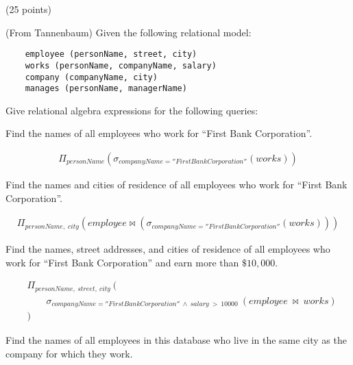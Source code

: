 \begin{problem} (25 points)

  \noindent
  (From Tannenbaum) Given the following relational model:

  \centering
  \begin{Verbatim}
    employee (personName, street, city)
    works (personName, companyName, salary)
    company (companyName, city)
    manages (personName, managerName)
  \end{Verbatim}

  \flushleft
  \noindent
  Give relational algebra expressions for the following queries:

  \begin{enumalph}
    \item Find the names of all employees who work for ``First Bank Corporation''.
    \begin{Answer}
      \begin{align*}
        \Pi_{personName}(\sigma_{companyName=''First Bank Corporation''}(works))
      \end{align*}
    \end{Answer}
    
    \item Find the names and cities of residence of all employees
    who work for ``First Bank Corporation''.
    \begin{Answer}
      \begin{align*}
        \Pi_{personName,\;city}(employee \Join (\sigma_{companyName = ''First Bank Corporation''}(works)))
      \end{align*}
    \end{Answer}
    \item Find the names, street addresses, and cities of residence
    of all employees who work for ``First Bank Corporation''
    and earn more than $\$ 10,000$.

    \begin{Answer}
      \begin{align*}
        &\Pi_{personName,\ street,\ city}\ (\\
          &\qquad \sigma_{companyName = ''First Bank Corporation''\ \wedge\ salary\ >\ 10000}\ (employee\ \Join\ works)\\
        &)
      \end{align*}
    \end{Answer}
  
    \item Find the names of all employees in this database who
    live in the same city as the company for which they work.


\end{enumalph}
\end{problem}
